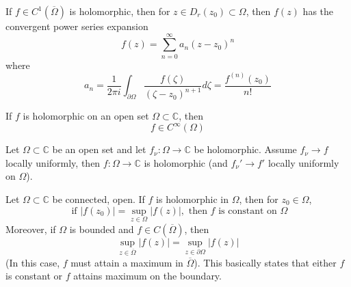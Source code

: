 \documentclass[openany]{book}
\newcommand{\C}{\mathbb{C}}
\begin{document}
\begin{thm}
    If $f\in C^1(\overline{\Omega})$ is holomorphic, then for $z\in D_r(z_0)\subset\Omega$, then $f(z)$ has the convergent power series expansion 
    \begin{equation*}
        f(z)=\sum_{n=0}^\infty a_n(z-z_0)^n
    \end{equation*}
    where 
    \begin{equation*}
        a_n=\frac{1}{2\pi i}\int_{\partial\Omega}\frac{f(\zeta)}{(\zeta-z_0)^{n+1}}d\zeta=\frac{f^{(n)}(z_0)}{n!}
    \end{equation*}
\end{thm}

\begin{prop}
    If $f$ is holomorphic on an open set $\Omega\subset\C$, then 
    \begin{equation*}
        f\in C^\infty(\Omega)
    \end{equation*}
\end{prop}



\begin{prop}
    Let $\Omega\subset\C$ be an open set and let $f_\nu:\Omega\to\C$ be holomorphic. Assume $f_\nu\to f$ locally uniformly, then $f:\Omega\to\C$ is holomorphic (and $f_\nu'\to f'$ locally uniformly on $\Omega$).
\end{prop} 


\begin{prop}
    Let $\Omega\subset\C$ be connected, open. If $f$ is holomorphic in $\Omega$, then for $z_0\in\Omega$,
    \begin{equation*}
        \text{ if } |f(z_0)|=\sup_{z\in\Omega}|f(z)|, \text{ then } f \text{ is constant on $\Omega$}
    \end{equation*}
    Moreover, if $\Omega$ is bounded and $f\in C(\overline{\Omega})$, then 
    \begin{equation*}
        \sup_{z\in\overline{\Omega}}|f(z)|=\sup_{z\in\partial\Omega}|f(z)|
    \end{equation*}
    (In this case, $f$ must attain a maximum in $\overline{\Omega}$). This basically states that either $f$ is constant or $f$ attains maximum on the boundary.
\end{prop}


\end{document}
